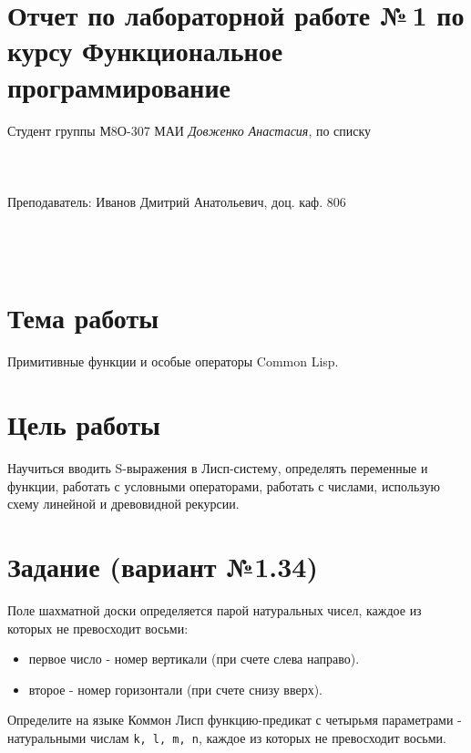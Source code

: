 \documentclass[12pt]{article}
\begin{document}
\section*{Отчет по лабораторной работе №\,1
по курсу \guillemotleft  Функциональное программирование\guillemotright}
\begin{flushright}
Студент группы М8О-307 МАИ \textit{Довженко Анастасия},  по списку \\
 \\
 \\
\ \\
Преподаватель: Иванов Дмитрий Анатольевич, доц. каф. 806 \\
 \\
 \\
 \\

\end{flushright}

\section{Тема работы}
Примитивные функции и особые операторы Common Lisp.

\section{Цель работы}
Научиться вводить S-выражения в Лисп-систему, определять переменные и функции, работать с условными операторами, работать с числами, использую схему линейной и древовидной рекурсии.

\section{Задание (вариант №1.34)}



Поле шахматной доски определяется парой натуральных чисел, каждое из которых не превосходит восьми:
\begin{itemize}
\item первое число - номер вертикали (при счете слева направо).
\item второе - номер горизонтали (при счете снизу вверх).
\end{itemize}

Определите на языке Коммон Лисп функцию-предикат с четырьмя параметрами - натуральными числам {\tt k, l, m, n}, каждое из которых не превосходит восьми.\\
\end{document}
